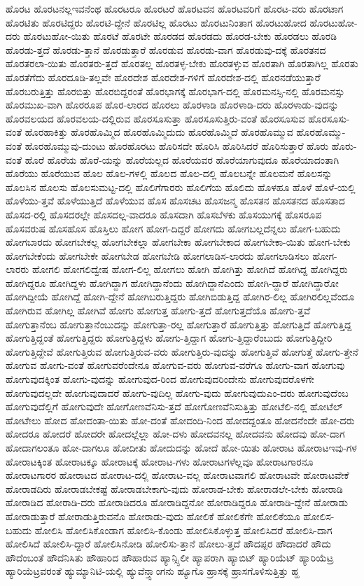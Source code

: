 {ಹೊರಟ
ಹೊರಟನಲ್ಲಇವನೆಂಥ
ಹೊರಟರೂ
ಹೊರಟರೆ
ಹೊರಟವನ
ಹೊರಟವರಿಗೆ
ಹೊರಟ-ವರು
ಹೊರಟಾಗ
ಹೊರಟಿತು
ಹೊರಟಿದ್ದರು
ಹೊರಟಿ-ದ್ದೇನೆ
ಹೊರಟಿಲ್ಲ
ಹೊರಟು
ಹೊರಟುನಿಂತಾಗ
ಹೊರಟುಹೋದ
ಹೊರಟುಹೋ-ದರು
ಹೊರಟುಹೋ-ಯಿತು
ಹೊರಟೆ
ಹೊರಟೇ
ಹೊರಡದ
ಹೊರಡದು
ಹೊರಡ-ಬೇಕು
ಹೊರಡಲು
ಹೊರಡಿ
ಹೊರಡು-ತ್ತದೆ
ಹೊರಡು-ತ್ತಾನೆ
ಹೊರಡುತ್ತಾರೆ
ಹೊರಡುವ
ಹೊರಡು-ವಾಗ
ಹೊರಡುವು-ದಕ್ಕೆ
ಹೊರತನದ
ಹೊರತರಲಾ-ಯಿತು
ಹೊರತರು-ತ್ತದೆ
ಹೊರತಲ್ಲ
ಹೊರತಳ್ಳ-ಬೇಕು
ಹೊರತಳ್ಳುವ
ಹೊರತಾಗಿ
ಹೊರತಾಗಿಲ್ಲ
ಹೊರತು
ಹೊರತೆಗೆದು
ಹೊರದೂಡಿ-ತಲ್ಲವೇ
ಹೊರದೇಶ
ಹೊರದೇಶ-ಗಳಿಗೆ
ಹೊರದೇಶ-ದಲ್ಲಿ
ಹೊರನಡೆಯುತ್ತಾರೆ
ಹೊರಬರುತ್ತಿತ್ತು
ಹೊರಬಿತ್ತು
ಹೊರಬಿದ್ದರಂತೆ
ಹೊರಭಾಗಕ್ಕೆ
ಹೊರಭಾಗ-ದಲ್ಲಿ
ಹೊರಮನಸ್ಸಿ-ನಲ್ಲಿ
ಹೊರಮನಸ್ಸು
ಹೊರಮುಖ-ವಾಗಿ
ಹೊರರೂಪ
ಹೊರ-ಲಾರದ
ಹೊರಲು
ಹೊರಳಾಡಿ
ಹೊರಳಾಡಿ-ದರು
ಹೊರಳಾಡು-ವುದನ್ನು
ಹೊರವಲಯದ
ಹೊರವಲಯ-ದಲ್ಲಿರುವ
ಹೊರಸೂಸುತ್ತಾ
ಹೊರಸೂಸುತ್ತಿರು-ವಂತೆ
ಹೊರಸೂಸುವ
ಹೊರಸೂಸು-ವಂತೆ
ಹೊರಹಾಕಿತ್ತು
ಹೊರಹೊಮ್ಮಿದ
ಹೊರಹೊಮ್ಮಿದುದು
ಹೊರಹೊಮ್ಮಿದೆ
ಹೊರಹೊಮ್ಮುವ
ಹೊರಹೊಮ್ಮು-ವಂತೆ
ಹೊರಹೊಮ್ಮುವು-ದುಂಟು
ಹೊರಹೊರಟು
ಹೊರಿಸದೇ
ಹೊರಿಸಿ
ಹೊರಿಸಿದರೆ
ಹೊರಿಸುತ್ತಾರೆ
ಹೊರು
ಹೊರು-ವಂತೆ
ಹೊರೆ
ಹೊರೆಯ
ಹೊರೆ-ಯನ್ನು
ಹೊರೆಯಲ್ಲದ
ಹೊರೆಯವರ
ಹೊರೆಯಾಗುವುದೂ
ಹೊರೆಯಾದಂತಾಗಿ
ಹೊರೆಯು
ಹೊರೆಯುವ
ಹೊಲ
ಹೊಲ-ಗಳಲ್ಲಿ
ಹೊಲದ
ಹೊಲ-ದಲ್ಲಿ
ಹೊಲಬನ್ನೇ
ಹೊಲಮನೆ
ಹೊಲಸನ್ನು
ಹೊಲಸಿನ
ಹೊಲಸು
ಹೊಲಸುಮಟ್ಟ-ದಲ್ಲಿ
ಹೊಲಿಗೆಗಾರರು
ಹೊಲಿಗೆಯ
ಹೊಲಿದು
ಹೊಳಹೂ
ಹೊಳೆ
ಹೊಳೆ-ಯಲ್ಲಿ
ಹೊಳೆಯು-ತ್ತವೆ
ಹೊಳೆಯುತ್ತಿದೆ
ಹೊಳೆಯುವ
ಹೊಸ
ಹೊಸಚಟ
ಹೊಸಜನ್ಮ
ಹೊಸತನ
ಹೊಸತನದ
ಹೊಸತಾದ
ಹೊಸದ-ರಲ್ಲಿ
ಹೊಸದರಲ್ಲೇ
ಹೊಸದಲ್ಲ-ವಾದರೂ
ಹೊಸದಾಗಿ
ಹೊಸಬೆಳಕು
ಹೊಸಯುಗಕ್ಕೆ
ಹೊಸರೂಪ
ಹೊಸವರುಷ
ಹೊಸಹೊಸ
ಹೊಸ್ತಿಲು
ಹೋಗ
ಹೋಗ-ದಿದ್ದರೆ
ಹೋಗದು
ಹೋಗಬಲ್ಲದೆನ್ನಲು
ಹೋಗ-ಬಹುದು
ಹೋಗಬಾರದು
ಹೋಗಬೇಕಲ್ಲ
ಹೋಗಬೇಕಲ್ಲಾ
ಹೋಗಬೇಕಾ
ಹೋಗಬೇಕಾದ
ಹೋಗಬೇಕಾ-ಯಿತು
ಹೋಗ-ಬೇಕು
ಹೋಗಬೇಕೆಂದು
ಹೋಗಬೇಕೇ
ಹೋಗಬೇಡ
ಹೋಗಬೇಡಿ
ಹೋಗಲಾಡಿಸ-ಲಾರದು
ಹೋಗಲಾಡಿಸಲು
ಹೋಗ-ಲಾರರು
ಹೋಗಲಿ
ಹೋಗಲಿದ್ವೇಷ
ಹೋಗ-ಲಿಲ್ಲ
ಹೋಗಲು
ಹೋಗಿ
ಹೋಗಿತ್ತು
ಹೋಗಿದೆ
ಹೋಗಿದ್ದ
ಹೋಗಿದ್ದರು
ಹೋಗಿದ್ದರೂ
ಹೋಗಿದ್ದಳು
ಹೋಗಿದ್ದಾಗ
ಹೋಗಿದ್ದಾನೆಂದು
ಹೋಗಿದ್ದಾನೆಎಂದು
ಹೋಗಿ-ದ್ದಾರೆ
ಹೋಗಿದ್ದಾರೋ
ಹೋಗಿದ್ದೀಯೆ
ಹೋಗಿದ್ದೆ
ಹೋಗಿ-ದ್ದೇನೆ
ಹೋಗಿಬರುತ್ತಿದ್ದರು
ಹೋಗಿಬಿಡುತ್ತಿದ್ದ
ಹೋಗಿರ-ಲಿಲ್ಲ
ಹೋಗಿರಲಿಲ್ಲವೆಂದೂ
ಹೋಗಿರುವ
ಹೋಗಿಲ್ಲ
ಹೋಗಿವೆ
ಹೋಗು
ಹೋಗುತ್ತ
ಹೋಗು-ತ್ತದೆ
ಹೋಗುತ್ತದೆಯೊ
ಹೋಗು-ತ್ತವೆ
ಹೋಗುತ್ತಾನೆಂಬ
ಹೋಗುತ್ತಾನೆಂಬುದನ್ನು
ಹೋಗುತ್ತಾ-ರಲ್ಲ
ಹೋಗುತ್ತಾರೆ
ಹೋಗುತ್ತಿತ್ತು
ಹೋಗುತ್ತಿದೆ
ಹೋಗುತ್ತಿದ್ದ
ಹೋಗುತ್ತಿದ್ದಂತೆ
ಹೋಗುತ್ತಿದ್ದರು
ಹೋಗುತ್ತಿದ್ದಳು
ಹೋಗು-ತ್ತಿದ್ದಾಗ
ಹೋಗು-ತ್ತಿದ್ದಾರೆಂಬುದು
ಹೋಗುತ್ತಿದ್ದೀರಿ
ಹೋಗುತ್ತಿದ್ದೇವೆ
ಹೋಗುತ್ತಿರುವ
ಹೋಗುತ್ತಿರುವ-ವರು
ಹೋಗುತ್ತಿರು-ವುದನ್ನು
ಹೋಗುತ್ತಿವೆ
ಹೋಗುತ್ತೆ
ಹೋಗು-ತ್ತೇನೆ
ಹೋಗುವ
ಹೋಗು-ವಂತೆ
ಹೋಗುವರೆಂದೇನೂ
ಹೋಗುವ-ವರು
ಹೋಗುವ-ವರೆಗೂ
ಹೋಗು-ವಾಗ
ಹೋಗುವು
ಹೋಗುವುದಕ್ಕಿಂತ
ಹೋಗು-ವುದನ್ನು
ಹೋಗುವುದ-ರಿಂದ
ಹೋಗುವುದರಿಂದೇನು
ಹೋಗುವುದರೊಳಗೇ
ಹೋಗುವುದಲ್ಲದೇ
ಹೋಗುವುದಾದರೆ
ಹೋಗು-ವುದಿಲ್ಲ
ಹೋಗು-ವುದು
ಹೋಗುವುದುಎಂ-ದರು
ಹೋಗುವುದೆಂಬ
ಹೋಗುವುದೆಲ್ಲಿಗೆ
ಹೋಗುವುದೇ
ಹೋಗೋಣವೆನಿಸು-ತ್ತದೆ
ಹೋಗೋಣವೆನಿಸುತ್ತಿತ್ತು
ಹೋಟೆಲಿ-ನಲ್ಲಿ
ಹೋಟೆಲ್
ಹೋಟೇಲು
ಹೋದ
ಹೋದಂತಾ-ಯಿತು
ಹೋ-ದಂತೆ
ಹೋದಂದಿ-ನಿಂದ
ಹೋದದ್ದಂತೂ
ಹೋದನೆಂದೇ
ಹೋ-ದರು
ಹೋದರೂ
ಹೋದರೆ
ಹೋದರೇ
ಹೋದಲ್ಲೆಲ್ಲಾ
ಹೋ-ದಳು
ಹೋದವನಲ್ಲ
ಹೋದವನು
ಹೋದವು
ಹೋ-ದಾಗ
ಹೋದಾಗಲಂತೂ
ಹೋ-ದಾಗಲೂ
ಹೋದೀತು
ಹೋದುದನ್ನು
ಹೋದೆ
ಹೋ-ಯಿತು
ಹೋರಾಟ
ಹೋರಾಟಇವು-ಗಳ
ಹೋರಾಟಕ್ಕಿಂತ
ಹೋರಾಟಕ್ಕೂ
ಹೋರಾಟಕ್ಕೆ
ಹೋರಾಟ-ಗಳು
ಹೋರಾಟಗಳೆಲ್ಲವೂ
ಹೋರಾಟಗಾರನೂ
ಹೋರಾಟಗಾರರ
ಹೋರಾಟದ
ಹೋರಾಟ-ದಲ್ಲಿ
ಹೋರಾಟ-ವಲ್ಲ
ಹೋರಾಟವಾಗಲಿ
ಹೋರಾಟವೇ
ಹೋರಾಟವೇಕೆ
ಹೋರಾಡದಿರು
ಹೋರಾಡಬೇಕಷ್ಟೆ
ಹೋರಾಡಬೇಕಾಗು-ವುದು
ಹೋರಾಡ-ಬೇಕು
ಹೋರಾಡಲೇ-ಬೇಕು
ಹೋರಾಡಿ
ಹೋರಾಡಿದ
ಹೋರಾಡಿ-ದರು
ಹೋರಾಡಿದರೂ
ಹೋರಾಡಿದ್ದನೋ
ಹೋರಾಡಿದ್ದರೂ
ಹೋರಾಡಿ-ದ್ದೇನೆ
ಹೋರಾಡು
ಹೋರಾಡುತ್ತಾರೆ
ಹೋರಾಡುತ್ತಿರುವನೊ
ಹೋರಾಡು-ವುದು
ಹೋಲಿಕೆ
ಹೋಲಿಕೆಗೇ
ಹೋಲಿಕೆಯೂ
ಹೋಲಿಸ-ಬಹುದು
ಹೋಲಿಸಿ
ಹೋಲಿಸಿಕೊಂಡಾಗ
ಹೋಲಿಸಿ-ಕೊಂಡು
ಹೋಲಿಸಿಕೊಳ್ಳುತ್ತ
ಹೋಲಿಸಿದರೆ
ಹೋಲಿಸಿ-ದಾಗ
ಹೋಲಿಸಿದೆ
ಹೋಲಿಸಿ-ದ್ದಾರೆ
ಹೋಲಿಸಿನೋಡಿ
ಹೋಲಿಸು-ತ್ತಾನೆ
ಹೋಲು-ತ್ತದೆ
ಹೌದಪ್ಪರ
ಹೌದಾದರೆ
ಹೌದು
ಹೌದೆಂಬಂತೆ
ಹೌದೆನಿಸಿತು
ಹೌಹಾರಿದ
ಹೌಹಾರುವ
ಹ್ಯಾನ್ಸ್ಸಿಲೀ
ಹ್ಯಾಪರಾಗಿ
ಹ್ಯಾಬಿಟ್
ಹ್ಯಾರಿಯೆಟ್
ಹ್ಯಾರಿಯೆಟ್ರ
ಹ್ಯಾರಿಯೆಟ್ರವರಂತೆ
ಹ್ಯುಮ್ಯಾನಿಟಿ-ಯಲ್ಲಿ
ಹ್ಯುವೆನ್ತ್ಸಾಂಗನು
ಹ್ಯೂಗೊ
ಹ್ರಾಸಕ್ಕೆ
ಹ್ರಾಸಗೊಳಿಸುತ್ತಿತ್ತು
ಹ್ಹ
}
